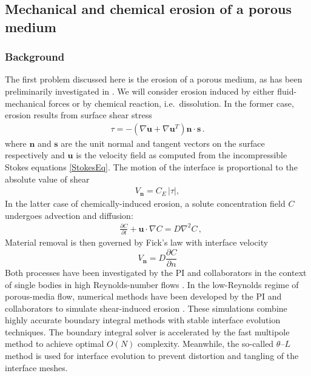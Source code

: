 \documentclass[11pt]{article}
\newcommand{\pd}[2]{ \frac{ \partial #1}{ \partial #2 } }
\newcommand{\bvec}[1]{{\mathbf{#1}}}
\newcommand{\grad}{\nabla}
\newcommand {\Lap} {\grad^2}
\newcommand{\abs}[1]{\left| #1 \right|}
\newcommand{\uu}{\bvec{u}}
\newcommand{\nn}{{\mathbf{n}}}
\renewcommand{\ss}{{\mathbf{s}}}
\newcommand{\Vn}{V_\nn}
\newcommand{\CE}{C_E}
\newcommand {\ny}{n}
\newcommand {\bdry} {\partial B}
\newcommand{\Diff}{D}
\newcommand{\thL}{$\theta$--$L$}
\begin{document}
\subsection{Mechanical and chemical erosion of a porous medium}

\subsubsection{Background}

The first problem discussed here is the erosion of a porous medium, as has been preliminarily investigated in \cite{Quaife2018}. We will consider erosion induced by either fluid-mechanical forces or by chemical reaction, i.e.~dissolution. In the former case, erosion results from surface shear stress
\begin{align}
\tau = -\left(\nabla \uu + \nabla \uu^T \right)\nn \cdot \ss \, .
\end{align}
where $\nn$ and $\ss$ are the unit normal and tangent vectors on the surface respectively and $\uu$ is the velocity field as computed from the incompressible Stokes equations \eqref{StokesEq}. 
The motion of the interface is proportional to the absolute value of shear
\begin{align}
\Vn = \CE \, \abs{\tau},
\end{align}
In the latter case of chemically-induced erosion, a solute concentration field $C$ undergoes advection and diffusion:
\begin{align}
\label{Ceq}
& \pd{C}{t} + \uu \cdot \grad C = \Diff \Lap C \, ,
\end{align}
Material removal is then governed by Fick's law with interface velocity
\begin{equation}
\label{DissVn}
\Vn = \left. \Diff \pd{C}{\ny} \right. %
\end{equation}
Both processes have been investigated by the PI and collaborators in the context of single bodies in high Reynolds-number flows \cite{Ristroph2012, MoorePOF2013, HuangJFM2015, MooreCPAM2017}. In the low-Reynolds regime of porous-media flow, numerical methods have been developed by the PI and collaborators to simulate shear-induced erosion \cite{Quaife2018}. These simulations combine highly accurate boundary integral methods with stable interface evolution techniques. The boundary integral solver is accelerated by the fast multipole method \cite{gre-rok1987, gre-gre-may1992} to achieve optimal $O(N)$ complexity. Meanwhile, the so-called {\thL} method is used for interface evolution to prevent distortion and tangling of the interface meshes.
\end{document}
